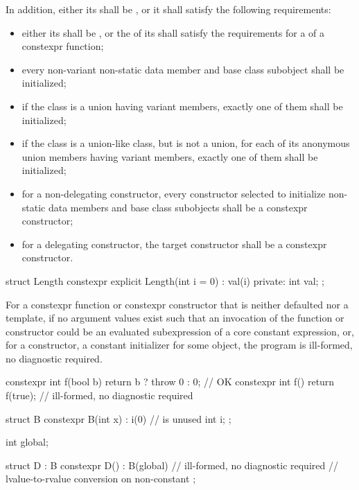 In addition, either its  shall be
, or it shall satisfy the following requirements:
\begin{itemize}
\item
either its  shall be , or the  of its 
shall satisfy the requirements for a  of a
constexpr function;

\item
every non-variant non-static data member and base class subobject
shall be initialized;

\item
if the class is a union having variant members, exactly one of them
shall be initialized;

\item
if the class is a union-like class, but is not a union, for each of its anonymous union
members having variant members, exactly one of them shall be initialized;

\item
for a non-delegating constructor, every constructor selected to initialize non-static
data members and base class subobjects shall be a constexpr constructor;

\item
for a delegating constructor, the target constructor shall be a constexpr
constructor.
\end{itemize}

\begin{example}
\begin{codeblock}
struct Length {
  constexpr explicit Length(int i = 0) : val(i) { }
private:
  int val;
};
\end{codeblock}
\end{example}

\pnum
For a constexpr function or constexpr constructor
that is neither defaulted nor a template,
if no argument values exist such that
an invocation of the function or constructor could be an evaluated subexpression of a core
constant expression, or,
for a constructor, a constant initializer for some object,
the program is ill-formed, no diagnostic required.
\begin{example}
\begin{codeblock}
constexpr int f(bool b)
  { return b ? throw 0 : 0; }           // OK
constexpr int f() { return f(true); }   // ill-formed, no diagnostic required

struct B {
  constexpr B(int x) : i(0) { }         //  is unused
  int i;
};

int global;

struct D : B {
  constexpr D() : B(global) { }         // ill-formed, no diagnostic required
                                        // lvalue-to-rvalue conversion on non-constant 
};
\end{codeblock}
\end{example}

